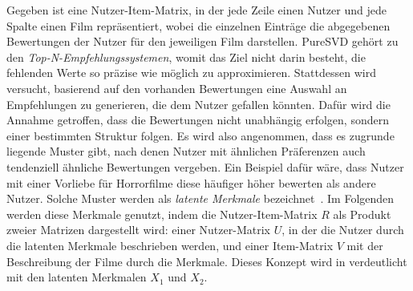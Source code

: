 Gegeben ist eine Nutzer-Item-Matrix, in der jede Zeile einen Nutzer und jede Spalte einen Film repräsentiert, wobei die einzelnen Einträge die abgegebenen Bewertungen der Nutzer für den jeweiligen Film darstellen.
PureSVD gehört zu den \emph{Top-N-Empfehlungssystemen}, womit das Ziel nicht darin besteht, die fehlenden Werte so präzise wie möglich zu approximieren.
Stattdessen wird versucht, basierend auf den vorhanden Bewertungen eine Auswahl an Empfehlungen zu generieren, die dem Nutzer gefallen könnten.
Dafür wird die Annahme getroffen, dass die Bewertungen nicht unabhängig erfolgen, sondern einer bestimmten Struktur folgen.
Es wird also angenommen, dass es zugrunde liegende Muster gibt, nach denen Nutzer mit ähnlichen Präferenzen auch tendenziell ähnliche Bewertungen vergeben.
Ein Beispiel dafür wäre, dass Nutzer mit einer Vorliebe für Horrorfilme diese häufiger höher bewerten als andere Nutzer.
Solche Muster werden als \emph{latente Merkmale} bezeichnet~\cite[31]{korenMatrixFactorizationTechniques2009}.
Im Folgenden werden diese Merkmale genutzt, indem die Nutzer-Item-Matrix \(R\) als Produkt zweier Matrizen dargestellt wird:
einer Nutzer-Matrix \(U\), in der die Nutzer durch die latenten Merkmale beschrieben werden, und einer Item-Matrix \(V\) mit der Beschreibung der Filme durch die Merkmale. 
Dieses Konzept wird in  verdeutlicht mit den latenten Merkmalen \(X_{1}\) und \(X_{2}\).  
